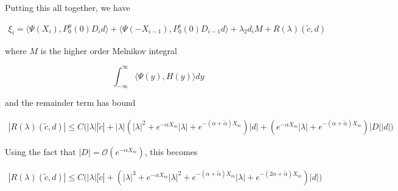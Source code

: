 \documentclass[12pt]{article}
\begin{document}
\begin{enumerate}
\end{enumerate}

Putting this all together, we have

\begin{align*}
\xi_i = \langle \Psi(X_i), P_0^u(0) D_i d \rangle
+ \langle \Psi(-X_{i-1}), P_0^s(0) D_{i-1} d \rangle 
+ \lambda_2 d_i M + R(\lambda)(\tilde{c}, d)
\end{align*}

where $M$ is the higher order Melnikov integral

\[
\int_{-\infty}^\infty \langle \Psi(y), H(y) \rangle dy 
\]

and the remainder term has bound

\begin{align*}
|R(\lambda)(\tilde{c}, d)| \leq C \Big(
|\lambda||\tilde{c}| + |\lambda|(|\lambda|^2 + e^{-\alpha X_m}|\lambda| + e^{-(\alpha + \tilde{\alpha}) X_m})|d| + (e^{-\alpha X_m} |\lambda| + e^{-(\alpha + \tilde{\alpha}) X_m})|D||d|
 \Big)
\end{align*}

Using the fact that $|D| = \mathcal{O}(e^{-\alpha X_m})$, this becomes

\begin{align*}
|R(\lambda)(\tilde{c}, d)| \leq C \Big(
|\lambda||\tilde{c}| + (|\lambda|^3 + e^{-\alpha X_m}|\lambda|^2 + e^{-(\alpha + \tilde{\alpha}) X_m}|\lambda| + e^{-(2 \alpha + \tilde{\alpha}) X_m})|d|
 \Big)
\end{align*}
\end{document}
